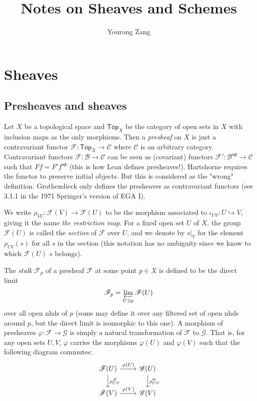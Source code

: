 \documentclass[12pt,letter]{article}
\title{Notes on Sheaves and Schemes}
\author{Yourong Zang}
\newcommand{\Top}[0]{\mathsf{Top}}
\newcommand{\op}[0]{\mathsf{op}}
\begin{document}
    \maketitle
    \tableofcontents
    \newpage
	\section{Sheaves}\label{sec-sheaf}
    \subsection{Presheaves and sheaves}\label{ssec-sheaf}
    Let $X$ be a topological space and $\Top_X$ be the category of open sets in $X$ with inclusion maps as the only morphisms. Then a \textit{presheaf} on $X$ is just a contravariant functor $\mathscr F:\Top_X\to \mathcal C$ where $\mathcal C$ is an arbitrary category. Contravariant functors $\mathscr F:\mathcal B\to\mathcal C$ can be seen as (covariant) functors $\mathscr F':\mathcal B^\op\to \mathcal C$ such that $Ff=F'f^\op$ (this is how Lean defines presheaves!). Hartshorne requires the functor to preserve initial objects. But this is considered as the "wrong" definition. Grothendieck only defines the presheaves as contravariant functors (see 3.1.1 in the 1971 Springer's version of EGA I).
    
    We write $\rho_{VU}:\mathscr F(V)\to\mathscr F(U)$ to be the morphism associated to $\iota_{UV}: U\hookrightarrow V$, giving it the name \textit{the restriction map}. For a fixed open set $U$ of $X$, the group $\mathscr F(U)$ is called the \textit{section} of $\mathscr F$ over $U$, and we denote by $s|_V$ for the element $\rho_{UV}(s)$ for all $s$ in the section (this notation has no ambiguity since we know to which $\mathscr F(U)$ $s$ belongs).
    
    The \textit{stalk} $\mathscr F_p$ of a presheaf $\mathscr F$ at some point $p\in X$ is defined to be the direct limit
    \[\mathscr F_p=\varprojlim_{U\ni p} \mathscr F(U)\] 
    over all open nhds of $p$ (some may define it over any filtered set of open nhds around $p$, but the direct limit is isomorphic to this one). A morphism of presheaves $\varphi:\mathscr F\to\mathscr G$ is simply a natural transformation of $\mathscr F$ to $\mathscr G$. That is, for any open sets $U, V$, $\varphi$ carries the morphisms $\varphi(U)$ and $\varphi(V)$ such that the following diagram commutes:
    \[
\begin{tikzcd}
\mathscr F(U) \arrow[d, "\rho_{UV}^{\mathscr F}"] \arrow[r, "\varphi(U)"] & \mathscr G(U) \arrow[d, "\rho_{UV}^{\mathscr G}"] \\
\mathscr F(V) \arrow[r, "\varphi(V)"]                                     & \mathscr G(V)                                    
\end{tikzcd}    
    \]
    
\end{document}
